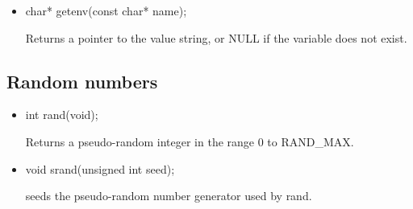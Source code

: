 \documentclass{report}
\begin{document}
\begin{itemize}
\begin{itemize}
                \item  If all system calls succeed, then the return value is the termination status of the child shell used to execute command. (The termination status of a shell is the termination status of the last command it executes.)
            \end{itemize}
        \item 
            \bigbreak \noindent 
            \begin{cppcode}
            char* getenv(const char* name);
            \end{cppcode}
            \bigbreak \noindent 
            Returns a pointer to the value string, or NULL if the variable does not exist.



    \end{itemize}

    \pagebreak 
    \subsection{Random numbers}
    \begin{itemize}
        \item
            \bigbreak \noindent 
            \begin{cppcode}
                int rand(void);
            \end{cppcode}
            \bigbreak \noindent 
            Returns a pseudo-random integer in the range 0 to RAND_MAX.
        \item 
            \bigbreak \noindent 
            \begin{cppcode}
            void srand(unsigned int seed);
            \end{cppcode}
            \bigbreak \noindent 
            seeds the pseudo-random number generator used by rand.

    \end{itemize}

    \pagebreak 
\end{document}
